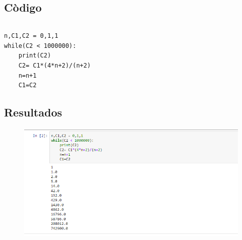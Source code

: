 \documentclass[12pt]{article}
\begin{document}
\subsection{Còdigo}

\begin{verbatim}

\end{verbatim}
\begin{verbatim}
n,C1,C2 = 0,1,1
while(C2 < 1000000): 
    print(C2)
    C2= C1*(4*n+2)/(n+2)
    n=n+1
    C1=C2
\end{verbatim}
\subsection{Resultados}

\begin{figure}[H]
\centering
\includegraphics[scale=.8]{Fibonacci}
\end{figure}
\end{document}
